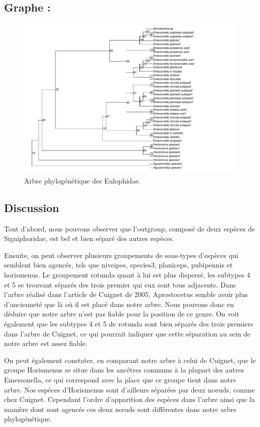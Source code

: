 \documentclass[a4paper, 12pt]{article}
\begin{document}
\subsection{Graphe :}

\begin{figure}[H]
    \centering
    \includegraphics[width=1.3\textwidth]{final_eulo.pdf}
    \caption{\small Arbre phylogénétique des Eulophidae.}
    \label{Eulo_tree}
\end{figure}

\subsection{Discussion}
Tout d’abord, nous pouvons observer que l’outgroup, composé de deux espèces de Signiphoridae, est bel et bien séparé des autres espèces.


Ensuite, on peut observer plusieurs groupements de sous-types d’espèces qui semblent bien agencés, tels que niveipes, species3, planiceps, pubipennis et horismenus. Le groupement rotunda quant à lui est plus dispersé, les subtypes 4 et 5 se trouvant séparés des trois premier qui eux sont tous adjacents. Dans l’arbre réalisé dans l’article de Cuignet de 2005, Aprostocetus semble avoir plus d’ancienneté que là où il est placé dans notre arbre. Nous pouvons donc en déduire que notre arbre n’est pas fiable pour la position de ce genre. On voit également que les subtypes 4 et 5 de rotunda sont bien séparés des trois premiers dans l’arbre de Cuignet, ce qui pourrait indiquer que cette séparation au sein de notre arbre est assez fiable. 


On peut également constater, en comparant notre arbre à celui de Cuignet, que le groupe Horismenus se situe dans les ancêtres communs à la plupart des autres Emersonella, ce qui correspond avec la place que ce groupe tient dans notre arbre. Nos espèces d’Horismenus sont d’ailleurs séparées par deux noeuds, comme chez Cuignet. Cependant l’ordre d’apparition des espèces dans l’arbre ainsi que la manière dont sont agencés ces deux nœuds sont différentes dans notre arbre phylogénétique.
\end{document}

